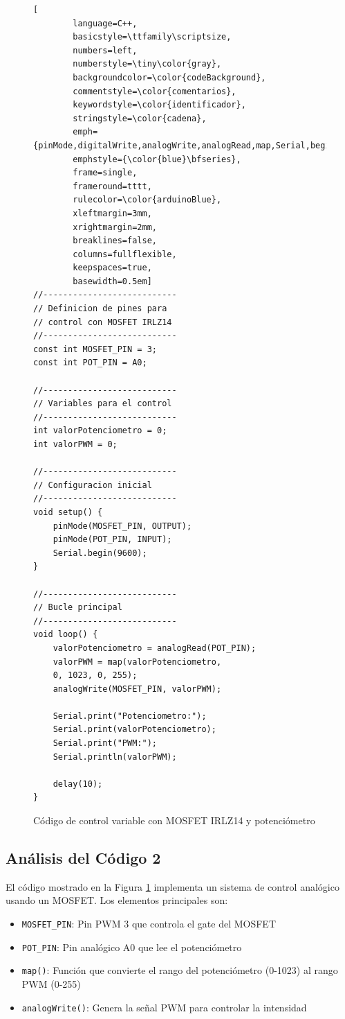 \begin{figure}[H]
	\centering
	\begin{lstlisting}[
		language=C++,
		basicstyle=\ttfamily\scriptsize,
		numbers=left,
		numberstyle=\tiny\color{gray},
		backgroundcolor=\color{codeBackground},
		commentstyle=\color{comentarios},
		keywordstyle=\color{identificador},
		stringstyle=\color{cadena},
		emph={pinMode,digitalWrite,analogWrite,analogRead,map,Serial,begin,print,println,HIGH,LOW},
		emphstyle={\color{blue}\bfseries},
		frame=single,
		frameround=tttt,
		rulecolor=\color{arduinoBlue},
		xleftmargin=3mm,
		xrightmargin=2mm,
		breaklines=false,
		columns=fullflexible,
		keepspaces=true,
		basewidth=0.5em]
//---------------------------
// Definicion de pines para
// control con MOSFET IRLZ14
//---------------------------
const int MOSFET_PIN = 3;    
const int POT_PIN = A0;      

//---------------------------
// Variables para el control
//---------------------------
int valorPotenciometro = 0;  
int valorPWM = 0;           

//---------------------------
// Configuracion inicial
//---------------------------
void setup() {
	pinMode(MOSFET_PIN, OUTPUT);    
	pinMode(POT_PIN, INPUT);        
	Serial.begin(9600);
}

//---------------------------
// Bucle principal
//---------------------------
void loop() {
	valorPotenciometro = analogRead(POT_PIN);
	valorPWM = map(valorPotenciometro, 
	0, 1023, 0, 255);
	analogWrite(MOSFET_PIN, valorPWM);
	
	Serial.print("Potenciometro:");
	Serial.print(valorPotenciometro);
	Serial.print("PWM:");
	Serial.println(valorPWM);
	
	delay(10);
}
	\end{lstlisting}
	\caption{C\'odigo de control variable con MOSFET IRLZ14 y potenci\'ometro}
	\label{fig:codigo-mosfet}
\end{figure}

\subsection{An\'alisis del C\'odigo 2}
El c\'odigo mostrado en la Figura \ref{fig:codigo-mosfet} implementa un sistema de control anal\'ogico usando un MOSFET. Los elementos principales son:

\begin{itemize}
	\item \texttt{MOSFET\_PIN}: Pin PWM 3 que controla el gate del MOSFET
	\item \texttt{POT\_PIN}: Pin anal\'ogico A0 que lee el potenci\'ometro
	\item \texttt{map()}: Funci\'on que convierte el rango del potenci\'ometro (0-1023) al rango PWM (0-255)
	\item \texttt{analogWrite()}: Genera la se\~nal PWM para controlar la intensidad
\end{itemize}

